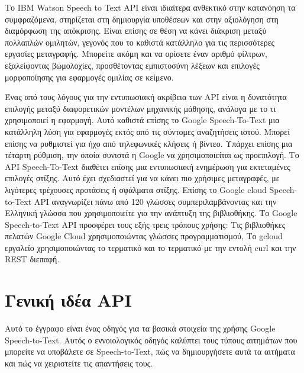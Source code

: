 \documentclass[oneside, 12pt]{book}
\begin{document}
Το IBM Watson Speech to Text API είναι ιδιαίτερα ανθεκτικό στην κατανόηση τα συμφραζόμενα,
στηρίζεται στη δημιουργία υποθέσεων και στην αξιολόγηση στη διαμόρφωση της απόκρισης.
Είναι επίσης σε θέση να κάνει διάκριση μεταξύ πολλαπλών ομιλητών, γεγονός που το καθιστά κατάλληλο
για τις περισσότερες εργασίες μεταγραφής.
Μπορείτε ακόμη και να ορίσετε έναν αριθμό φίλτρων, εξαλείφοντας βωμολοχίες, προσθέτοντας εμπιστοσύνη
λέξεων και επιλογές μορφοποίησης για εφαρμογές ομιλίας σε κείμενο.

Ένας από τους λόγους για την εντυπωσιακή ακρίβεια των API είναι η δυνατότητα επιλογής μεταξύ
διαφορετικών μοντέλων μηχανικής μάθησης, ανάλογα με το τι χρησιμοποιεί η εφαρμογή.
Αυτό καθιστά επίσης το Google Speech-To-Text μια κατάλληλη λύση για εφαρμογές εκτός από τις σύντομες
αναζητήσεις ιστού.
Μπορεί επίσης να ρυθμιστεί για ήχο από τηλεφωνικές κλήσεις ή βίντεο.
Υπάρχει επίσης μια τέταρτη ρύθμιση, την οποία συνιστά η Google να χρησιμοποιείται ως προεπιλογή.
Το API Speech-To-Text διαθέτει επίσης μια εντυπωσιακή ενημέρωση για εκτεταμένες επιλογές στίξης.
Αυτό έχει σχεδιαστεί για να κάνει πιο χρήσιμες μεταγραφές, με λιγότερες τρέχουσες προτάσεις ή
σφάλματα στίξης.
Επίσης το Google cloud Speech-to-Text API αναγνωρίζει πάνω από 120 γλώσσες συμπεριλαμβάνοντας και
την Ελληνική γλώσσα που χρησιμοποιείτε για την ανάπτυξη της βιβλιοθήκης.
Το Google Speech-to-Text API προσφέρει τους εξής τρεις τρόπους χρήσης: Τις βιβλιοθήκες πελατών
Google Cloud χρησιμοποιώντας γλώσσες προγραμματισμού, Το gcloud εργαλείο χρησιμοποιώντας το τερματικό
και το τερματικό με την εντολή curl και την REST διεπαφή.

\chapter{Γενική ιδέα API}
\label{ch:γενική-ιδέα-api}
Αυτό το έγγραφο είναι ένας οδηγός για τα βασικά στοιχεία της χρήσης Google Speech-to-Text.
Αυτός ο εννοιολογικός οδηγός καλύπτει τους τύπους αιτημάτων που μπορείτε να υποβάλετε σε
Speech-to-Text, πώς να δημιουργήσετε αυτά τα αιτήματα και πώς να χειριστείτε τις απαντήσεις τους.
\end{document}
